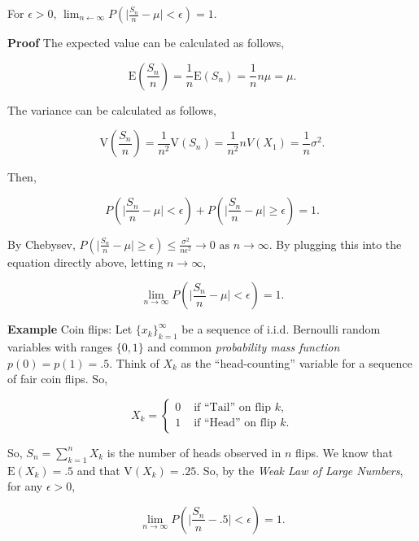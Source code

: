 \documentclass[12pt]{article}
\newcommand{\expected}[1]{\text{E}(#1)}
\newcommand{\variance}[1]{\text{V}(#1)}
\begin{document}
\begin{center}
For $\epsilon > 0$, $\lim_{n \leftarrow \infty} P(\lvert \frac{S_n}{n} - \mu \rvert < \epsilon) = 1$.
\end{center}

\begin{tcolorbox}
\noindent
\textbf{Proof} The expected value can be calculated as follows, 

\begin{equation*}
\expected{\frac{S_n}{n}} = \frac{1}{n} \expected{S_n} = \frac{1}{n} n \mu = \mu.
\end{equation*}

\noindent
The variance can be calculated as follows, 

\begin{equation*}
\variance{\frac{S_n}{n}} = \frac{1}{n^2} \variance{S_n} = \frac{1}{n^2} n V(X_1) = \frac{1}{n} \sigma^2.
\end{equation*}

\noindent
Then, 

\begin{equation*}
P(\lvert \frac{S_n}{n} - \mu \rvert < \epsilon) + P(\lvert \frac{S_n}{n} - \mu \rvert \geq \epsilon) = 1.
\end{equation*}

\noindent
By Chebysev, $P(\lvert \frac{S_n}{n} - \mu \rvert \geq \epsilon) \leq \frac{\sigma^2}{n \epsilon^2} \rightarrow 0 \text{ as } n \rightarrow \infty$. By plugging this into the equation directly above, letting $n \rightarrow \infty$, 

\begin{equation*}
\lim_{n \rightarrow \infty} P(\lvert \frac{S_n}{n} - \mu \rvert < \epsilon) = 1.
\end{equation*}
\end{tcolorbox}

\vspace*{.5cm}

\begin{tcolorbox}
\textbf{Example} Coin flips: Let $\big \{ x_k \big \}_{k=1}^{\infty}$ be a sequence of i.i.d. Bernoulli random variables with ranges $\{ 0, 1\}$ and common \textit{probability mass function} $p(0)=p(1) = .5$. Think of $X_k$ as the ``head-counting'' variable for a sequence of fair coin flips. So, 

\[ X_k = \begin{cases} 
      0 & \text{ if ``Tail'' on flip } k, \\
      1 & \text{ if ``Head'' on flip } k.
      \end{cases} \]
  
 \noindent
So, $S_n = \sum_{k = 1}^{n} X_k$ is the number of heads observed in $n$ flips. We know that $\expected{X_k} = .5$ and that $\variance{X_k} = .25$. So, by the \textit{Weak Law of Large Numbers}, for any $\epsilon > 0$, 
 
 \begin{equation*}
 \lim_{n \rightarrow \infty} P(\lvert \frac{S_n}{n} - .5 \rvert < \epsilon) = 1.
 \end{equation*}
\end{tcolorbox}
\end{document}
